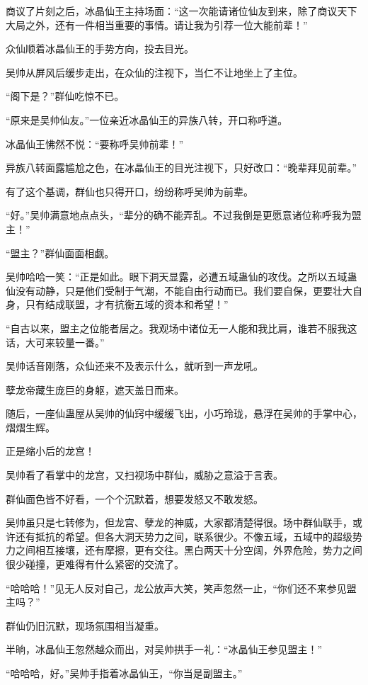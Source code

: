 \begin{this_body}
商议了片刻之后，冰晶仙王主持场面：“这一次能请诸位仙友到来，除了商议天下大局之外，还有一件相当重要的事情。请让我为引荐一位大能前辈！”

众仙顺着冰晶仙王的手势方向，投去目光。

吴帅从屏风后缓步走出，在众仙的注视下，当仁不让地坐上了主位。

“阁下是？”群仙吃惊不已。

“原来是吴帅仙友。”一位亲近冰晶仙王的异族八转，开口称呼道。

冰晶仙王怫然不悦：“要称呼吴帅前辈！”

异族八转面露尴尬之色，在冰晶仙王的目光注视下，只好改口：“晚辈拜见前辈。”

有了这个基调，群仙也只得开口，纷纷称呼吴帅为前辈。

“好。”吴帅满意地点点头，“辈分的确不能弄乱。不过我倒是更愿意诸位称呼我为盟主！”

“盟主？”群仙面面相觑。

吴帅哈哈一笑：“正是如此。眼下洞天显露，必遭五域蛊仙的攻伐。之所以五域蛊仙没有动静，只是他们受制于气潮，不能自由行动而已。我们要自保，更要壮大自身，只有结成联盟，才有抗衡五域的资本和希望！”

“自古以来，盟主之位能者居之。我观场中诸位无一人能和我比肩，谁若不服我这话，大可来较量一番。”

吴帅话音刚落，众仙还来不及表示什么，就听到一声龙吼。

孽龙帝藏生庞巨的身躯，遮天盖日而来。

随后，一座仙蛊屋从吴帅的仙窍中缓缓飞出，小巧玲珑，悬浮在吴帅的手掌中心，熠熠生辉。

正是缩小后的龙宫！

吴帅看了看掌中的龙宫，又扫视场中群仙，威胁之意溢于言表。

群仙面色皆不好看，一个个沉默着，想要发怒又不敢发怒。

吴帅虽只是七转修为，但龙宫、孽龙的神威，大家都清楚得很。场中群仙联手，或许还有抵抗的希望。但各大洞天势力之间，联系很少。不像五域，五域中的超级势力之间相互接壤，还有摩擦，更有交往。黑白两天十分空阔，外界危险，势力之间很少碰撞，更难得有什么紧密的交流了。

“哈哈哈！”见无人反对自己，龙公放声大笑，笑声忽然一止，“你们还不来参见盟主吗？”

群仙仍旧沉默，现场氛围相当凝重。

半晌，冰晶仙王忽然越众而出，对吴帅拱手一礼：“冰晶仙王参见盟主！”

“哈哈哈，好。”吴帅手指着冰晶仙王，“你当是副盟主。”


\end{this_body}
